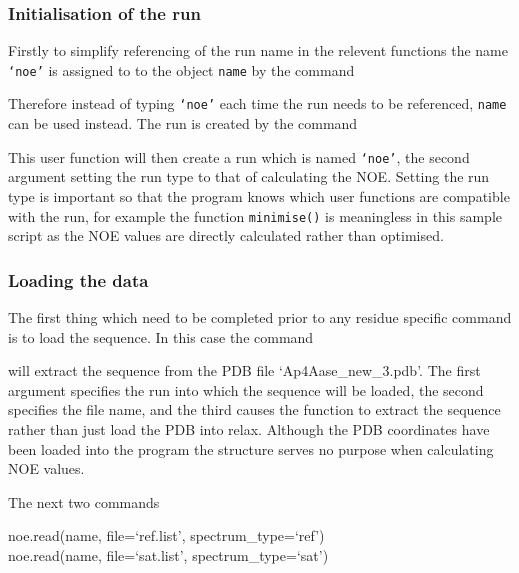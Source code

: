 \subsubsection{Initialisation of the run} \label{NOE initialisation}

Firstly to simplify referencing of the run name in the relevent functions the name \texttt{`noe'} is assigned to to the object \texttt{name} by the command


Therefore instead of typing \texttt{`noe'} each time the run needs to be referenced, \texttt{name} can be used instead.  The run is created by the command


This user function will then create a run which is named \texttt{`noe'}, the second argument setting the run type to that of calculating the NOE.  Setting the run type is important so that the program knows which user functions are compatible with the run, for example the function \texttt{minimise()} is meaningless in this sample script as the NOE values are directly calculated rather than optimised.


\subsubsection{Loading the data}

The first thing which need to be completed prior to any residue specific command is to load the sequence.  In this case the command


will extract the sequence from the PDB file `Ap4Aase\_new\_3.pdb'.  The first argument specifies the run into which the sequence will be loaded, the second specifies the file name, and the third causes the function to extract the sequence rather than just load the PDB into relax.  Although the PDB coordinates have been loaded into the program the structure serves no purpose when calculating NOE values.

The next two commands

\begin{exampleenv}
noe.read(name, file=`ref.list', spectrum\_type=`ref') \\
noe.read(name, file=`sat.list', spectrum\_type=`sat')
\end{exampleenv}

